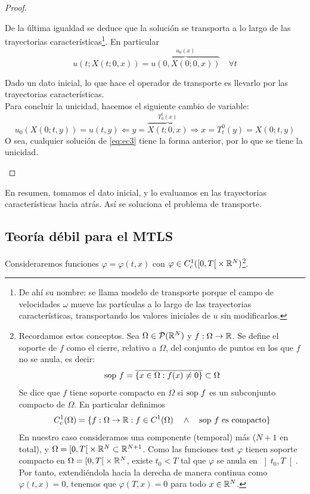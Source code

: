 \begin{proof}
\begin{itemize}
        De la última igualdad se deduce que la solución se transporta a lo largo de las trayectorias características\footnote{De ahí su nombre: se llama modelo de transporte porque el campo de velocidades $\omega$ mueve las partículas a lo largo de las trayectorias características, 
        transportando los valores iniciales de $u$ sin modificarlos.}. 
        En particular
        $$u(t;X(t;0,x)) = \overbrace{u(0,X(0;0,x))}^{u_0(x)} \quad \forall t$$
        
        Dado un dato inicial, lo que hace el operador de transporte es llevarlo por las trayectorias características. \\

        Para concluir la unicidad, hacemos el siguiente cambio de variable:
        $$u_0(X(0;t,y)) = u(t,y)\Longleftarrow y = \overbrace{X(t;0,x)}^{T_0^t(x)} \Longrightarrow x = T_t^{0}(y) = X(0;t,y)$$
        O sea, cualquier solución de \eqref{eq:ec3} tiene la forma anterior, por lo que se tiene la unicidad. \qedhere
    \end{itemize}
\end{proof}

En resumen, tomamos el dato inicial, y lo evaluamos en las trayectorias características hacia atrás. Así se soluciona el problema de transporte.



\subsection{Teoría débil para el MTLS}

Consideraremos funciones $\varphi = \varphi(t,x)$ con $\varphi \in C^1_c(\left[0,T \right[ \times \mathbb{R}^N)$\footnote{Recordamos estos conceptos. Sea $\Omega\in\mathcal{P}(\mathbb{R}^N)$ y $f:\Omega\to\mathbb{R}$. Se define el soporte de $f$ como el cierre, relativo a $\Omega$, del conjunto de puntos en los que $f$ no se anula, es decir:
$$\text{sop } f = \overline{\{x \in \Omega : f(x) \neq 0\}} \subset \Omega$$ Se dice que $f$ tiene soporte compacto en $\Omega$ si $\text{sop } f$ es un subconjunto compacto de $\Omega$. En particular definimos 
$$C_c^1(\Omega) = \{f : \Omega \to \mathbb{R} : f \in C^1(\Omega) \quad \land \quad \text{sop } f \text{ es compacto}\}$$ En nuestro caso consideramos una componente (temporal) más ($N+1$ en total), y $\Omega = \left[0,T\right[ \times \mathbb{R}^N \subset \mathbb{R}^{N+1}$. 
Como las funciones test $\varphi$ tienen soporte compacto en $\Omega=\left[0,T \right[\times\mathbb{R}^N$, existe $t_0 < T$ tal que $\varphi$ se anula en $\left]t_0, T \right[$. Por tanto, extendiéndola hacia la derecha de manera continua como $\varphi(t,x) = 0$, tenemos que $\varphi(T,x)=0$ para todo $x\in\mathbb{R}^N$.}. \\ 

